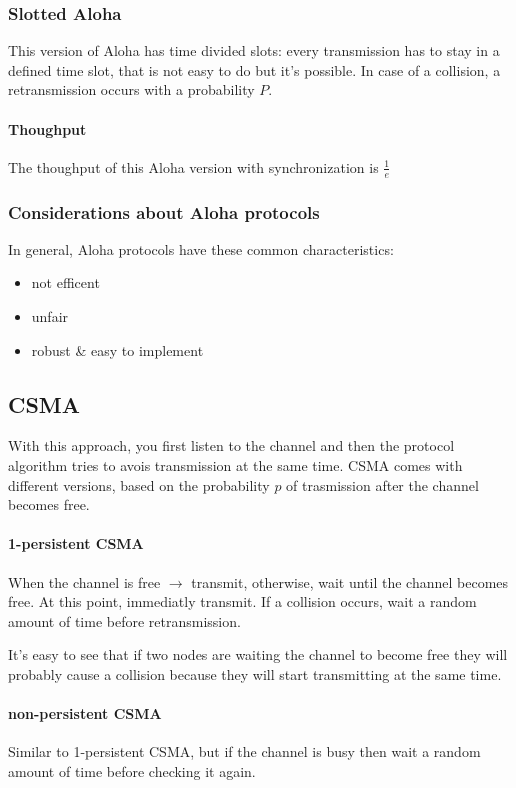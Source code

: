 \subsubsection{Slotted Aloha}

This version of Aloha has time divided slots: every transmission has to stay in
a defined time slot, that is not easy to do but it's possible. In case of a
collision, a retransmission occurs with a probability $P$.

\paragraph*{Thoughput} The thoughput of this Aloha version with synchronization
is $\frac{1}{e}$

\subsubsection{Considerations about Aloha protocols}

In general, Aloha protocols have these common characteristics:
\begin{itemize}
\item not efficent
\item unfair
\item robust \& easy to implement
\end{itemize}

\subsection{CSMA}

With this approach, you first listen to the channel and then the protocol
algorithm tries to avois transmission at the same time. CSMA comes with
different versions, based on the probability $p$ of trasmission after the
channel becomes free.

\paragraph*{1-persistent CSMA} When the channel is free $\to$ transmit,
otherwise, wait until the channel becomes free. At this point, immediatly
transmit. If a collision occurs, wait a random amount of time before
retransmission.

It's easy to see that if two nodes are waiting the channel to become free they
will probably cause a collision because they will start transmitting at the
same time.

\paragraph*{non-persistent CSMA} Similar to 1-persistent CSMA, but if the
channel is busy then wait a random amount of time before checking it again.

